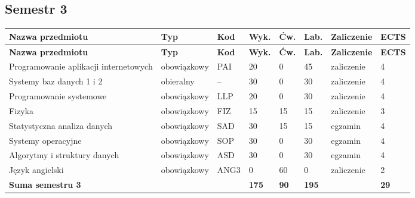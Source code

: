 \documentclass[12pt,a4paper]{article}
\newcommand{\thdrule}{\noalign{\global\setlength{\extrarowheight}{0pt}}}
\newcommand{\thdend}{\noalign{\global\setlength{\extrarowheight}{4pt}}}
\begin{document}
\subsection*{Semestr 3}

{\scriptsize
\begin{longtable}{m{5.0cm}m{1.9cm}m{0.75cm}m{0.85cm}m{0.85cm}m{0.85cm}m{1.45cm}m{0.9cm}}
\thdrule\toprule
\rowcolor{pjatkRed}
{\color{white}\footnotesize\textbf{\vphantom{Ag}Nazwa przedmiotu}} & {\color{white}\footnotesize\textbf{\vphantom{Ag}Typ}} & {\color{white}\footnotesize\textbf{\vphantom{Ag}Kod}} & {\color{white}\footnotesize\textbf{\vphantom{Ag}Wyk.}} & {\color{white}\footnotesize\textbf{\vphantom{Ag}Ćw.}} & {\color{white}\footnotesize\textbf{\vphantom{Ag}Lab.}} & {\color{white}\footnotesize\textbf{\vphantom{Ag}Zaliczenie}} & {\color{white}\footnotesize\textbf{\vphantom{Ag}ECTS}} \\
\midrule\thdend
\endfirsthead
\thdrule\toprule
\rowcolor{pjatkRed}
{\color{white}\footnotesize\textbf{\vphantom{Ag}Nazwa przedmiotu}} & {\color{white}\footnotesize\textbf{\vphantom{Ag}Typ}} & {\color{white}\footnotesize\textbf{\vphantom{Ag}Kod}} & {\color{white}\footnotesize\textbf{\vphantom{Ag}Wyk.}} & {\color{white}\footnotesize\textbf{\vphantom{Ag}Ćw.}} & {\color{white}\footnotesize\textbf{\vphantom{Ag}Lab.}} & {\color{white}\footnotesize\textbf{\vphantom{Ag}Zaliczenie}} & {\color{white}\footnotesize\textbf{\vphantom{Ag}ECTS}} \\
\midrule\thdend
\endhead
\rowcolor{tableRowLight} Programowanie aplikacji internetowych & {\scriptsize obowiązkowy} & PAI & 20 & 0 & 45 & {\scriptsize zaliczenie} & 4 \\
\rowcolor{tableElective} Systemy baz danych 1 i 2 & {\scriptsize obieralny} & -- & 30 & 0 & 30 & {\scriptsize zaliczenie} & 4 \\
\rowcolor{tableRowAlt} Programowanie systemowe & {\scriptsize obowiązkowy} & LLP & 20 & 0 & 30 & {\scriptsize zaliczenie} & 4 \\
\rowcolor{tableRowLight} Fizyka & {\scriptsize obowiązkowy} & FIZ & 15 & 15 & 15 & {\scriptsize zaliczenie} & 3 \\
\rowcolor{tableRowAlt} Statystyczna analiza danych & {\scriptsize obowiązkowy} & SAD & 30 & 15 & 15 & {\scriptsize egzamin} & 4 \\
\rowcolor{tableRowLight} Systemy operacyjne & {\scriptsize obowiązkowy} & SOP & 30 & 0 & 30 & {\scriptsize egzamin} & 4 \\
\rowcolor{tableRowAlt} Algorytmy i struktury danych & {\scriptsize obowiązkowy} & ASD & 30 & 0 & 30 & {\scriptsize egzamin} & 4 \\
\rowcolor{tableRowLight} Język angielski & {\scriptsize obowiązkowy} & ANG3 & 0 & 60 & 0 & {\scriptsize zaliczenie} & 2 \\
\midrule[\heavyrulewidth]
\rowcolor{tableSummary} \textbf{Suma semestru 3} & & & \textbf{175} & \textbf{90} & \textbf{195} & & \textbf{29} \\
\bottomrule
\end{longtable}}
\end{document}
